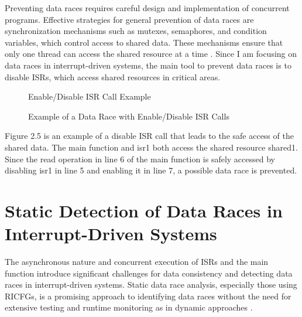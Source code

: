 \documentclass[
fancyheadings, %
%
%
]{stsreprt}
\begin{document}
{Preventing data races requires careful design and implementation of concurrent programs. Effective strategies for general prevention of data races are synchronization mechanisms such as mutexes, semaphores, and condition variables, which control access to shared data. These mechanisms ensure that only one thread can access the shared resource at a time \cite{herlihy2008}. Since I am focusing on data races in interrupt-driven systems, the main tool to prevent data races is to disable ISRs, which access shared resources in critical areas.
\begin{figure}[H]
	\centering
	\begin{algorithm}[H]
		\caption{Enable/Disable ISR Call Example}
		
		
		
		
	\end{algorithm}
	\caption{Example of a Data Race with Enable/Disable ISR Calls}
\end{figure}

Figure 2.5 is an example of a disable ISR call that leads to the safe access of the shared data. The main function and isr1 both access the shared resource shared1. Since the read operation in line 6 of the main function is safely accessed by disabling isr1 in line 5 and enabling it in line 7, a possible data race is prevented.

\section{Static Detection of Data Races in Interrupt-Driven Systems}

The asynchronous nature and concurrent execution of ISRs and the main function introduce significant challenges for data consistency and detecting data races in interrupt-driven systems. Static data race analysis, especially those using RICFGs, is a promising approach to identifying data races without the need for extensive testing and runtime monitoring as in dynamic approaches \cite{wang2020}.

}
\end{document}
